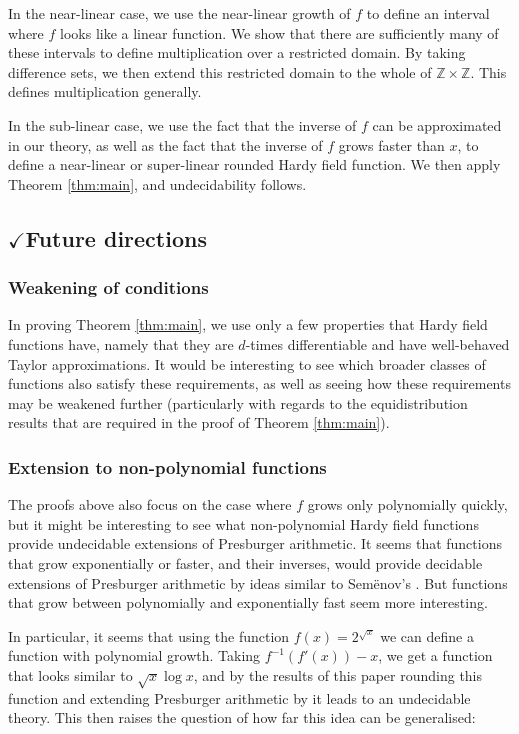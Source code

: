 \documentclass{amsart}
\theoremstyle{definition}
\newcommand{\ZZ}{\mathbb{Z}}
\newcommand{\inv}[1]{#1^{-1}}
\begin{document}
In the near-linear case, we use the near-linear growth of $f$ to define an interval
where $f$ looks like a linear function. We show that there are sufficiently many of these intervals to define multiplication over a restricted domain. By taking difference sets, we then extend this restricted domain to the whole of $\ZZ \times \ZZ$. This defines multiplication generally.

In the sub-linear case, we use the fact that the inverse of $f$ can be approximated in our theory, as well as the fact that the inverse of $f$ grows faster than $x$, to define a near-linear or super-linear rounded Hardy field function. We then apply Theorem \ref{thm:main}, and undecidability follows.

\subsection{$\checkmark$Future directions}
\label{subsec:future-directions}

\subsubsection{Weakening of conditions}

In proving Theorem \ref{thm:main}, we use only a few properties that Hardy field functions have, namely that they are $d$-times differentiable and have well-behaved Taylor approximations. It would be interesting to see which broader classes of functions also satisfy these requirements, as well as seeing how these requirements may be weakened further (particularly with regards to the equidistribution results that are required in the proof of Theorem \ref{thm:main}).

\subsubsection{Extension to non-polynomial functions}

The proofs above also focus on the case where $f$ grows only polynomially quickly, but it might be interesting to see what non-polynomial Hardy field functions provide undecidable extensions of Presburger arithmetic. It seems that functions that grow exponentially or faster, and their inverses, would provide decidable extensions of Presburger arithmetic by ideas similar to Sem\"enov's \cite{Semenov-1979,Semenov-1983}. But functions that grow between polynomially and exponentially fast seem more interesting.

In particular, it seems that using the function $f(x) = 2^{\sqrt{x}}$ we can define a function with polynomial growth. Taking $\inv{f}(f'(x)) - x$, we get a function that looks similar to $\sqrt{x} \log x$, and by the results of this paper rounding this function and extending Presburger arithmetic by it leads to an undecidable theory. This then raises the question of how far this idea can be generalised:
\end{document}
